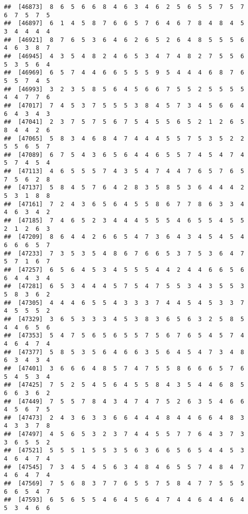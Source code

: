 \documentclass[
]{book}
\begin{document}
\begin{verbatim}
##  [46873]  8  6  5  6  6  8  4  6  3  4  6  2  5  6  5  5  7  5  7  6  7  5  7  5
##  [46897]  6  1  4  5  8  7  6  6  5  7  6  4  6  7  8  4  8  4  5  3  4  4  4  4
##  [46921]  8  7  6  5  3  6  4  6  2  6  5  2  6  4  8  5  5  5  6  4  6  3  8  7
##  [46945]  4  3  5  4  8  2  4  6  5  3  4  7  4  8  2  7  5  5  6  5  3  5  6  4
##  [46969]  6  5  7  4  4  6  6  5  5  5  9  5  4  4  4  6  8  7  6  5  5  7  4  5
##  [46993]  3  2  3  5  8  5  6  4  5  6  6  7  5  5  2  5  5  5  5  4  4  7  7  6
##  [47017]  7  4  5  3  7  5  5  5  3  8  4  5  7  3  4  5  6  6  4  6  4  3  4  3
##  [47041]  2  3  7  5  7  5  6  7  5  4  5  5  6  5  2  1  2  6  5  8  4  4  2  6
##  [47065]  5  8  3  4  6  8  4  7  4  4  4  5  5  7  5  3  5  2  2  5  5  6  5  7
##  [47089]  6  7  5  4  3  6  5  6  4  4  6  5  5  7  4  5  4  7  4  5  7  4  5  4
##  [47113]  4  6  5  5  5  7  4  3  5  4  7  4  4  7  6  5  7  6  5  7  5  6  2  8
##  [47137]  5  8  4  5  7  6  4  2  8  3  5  8  5  3  6  4  4  4  2  5  3  1  8  8
##  [47161]  7  2  4  3  6  5  6  4  5  5  8  6  7  7  8  6  3  3  4  4  6  3  4  2
##  [47185]  7  4  6  5  2  3  4  4  4  5  5  5  4  6  5  5  4  5  5  2  1  2  6  3
##  [47209]  8  6  4  4  2  6  6  5  4  7  3  6  4  3  4  5  4  5  4  6  6  6  5  7
##  [47233]  7  3  5  3  5  4  8  6  7  6  6  5  3  7  5  3  6  4  7  5  7  1  6  7
##  [47257]  6  5  6  4  5  3  4  5  5  5  4  4  2  4  4  6  6  5  6  6  4  4  3  4
##  [47281]  6  5  3  4  4  4  5  7  5  4  7  5  5  3  4  3  5  5  3  5  8  3  6  2
##  [47305]  4  4  4  6  5  5  4  3  3  3  7  4  4  5  4  5  3  3  7  4  5  5  5  2
##  [47329]  3  6  5  3  3  3  4  5  3  8  3  6  5  6  3  2  5  8  5  4  4  6  5  6
##  [47353]  5  4  7  5  6  5  6  5  5  7  5  6  7  6  5  4  5  7  4  4  6  4  7  4
##  [47377]  5  8  5  3  5  6  4  6  6  3  5  6  4  5  4  7  3  4  8  6  3  4  3  4
##  [47401]  3  6  6  6  4  8  5  7  4  7  5  5  8  6  6  6  5  7  6  5  4  5  3  4
##  [47425]  7  5  2  5  4  5  6  4  5  5  8  4  3  5  4  4  6  8  5  6  6  3  6  2
##  [47449]  7  5  5  7  8  4  3  4  7  4  7  5  2  6  3  5  4  6  6  4  5  6  7  5
##  [47473]  2  4  3  6  3  3  6  6  4  4  4  8  4  4  6  6  4  8  3  4  3  3  7  8
##  [47497]  4  5  6  5  3  2  3  7  4  4  5  5  7  7  6  4  3  7  3  3  6  5  5  2
##  [47521]  5  5  5  1  5  5  3  5  6  3  6  6  5  6  5  4  4  5  3  4  6  4  7  4
##  [47545]  7  3  4  5  4  5  6  3  4  8  4  6  5  5  7  4  8  4  7  4  6  4  7  4
##  [47569]  7  5  6  8  3  7  7  6  5  5  7  5  8  4  7  7  5  5  5  6  6  5  4  7
##  [47593]  6  5  6  5  5  4  6  4  5  6  4  7  4  4  6  4  4  6  4  5  3  4  6  6

\end{verbatim}
\end{document}
